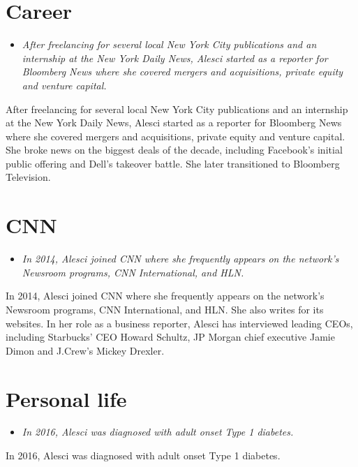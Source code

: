 \section{Career}\label{career}

\begin{itemize}
\item
  \emph{After freelancing for several local New York City publications
  and an internship at the New York Daily News, Alesci started as a
  reporter for Bloomberg News where she covered mergers and
  acquisitions, private equity and venture capital.}
\end{itemize}

After freelancing for several local New York City publications and an
internship at the New York Daily News, Alesci started as a reporter for
Bloomberg News where she covered mergers and acquisitions, private
equity and venture capital. She broke news on the biggest deals of the
decade, including Facebook's initial public offering and Dell's takeover
battle. She later transitioned to Bloomberg Television.

\section{CNN}\label{cnn}

\begin{itemize}
\item
  \emph{In 2014, Alesci joined CNN where she frequently appears on the
  network's Newsroom programs, CNN International, and HLN.}
\end{itemize}

In 2014, Alesci joined CNN where she frequently appears on the network's
Newsroom programs, CNN International, and HLN. She also writes for its
websites. In her role as a business reporter, Alesci has interviewed
leading CEOs, including Starbucks' CEO Howard Schultz, JP Morgan chief
executive Jamie Dimon and J.Crew's Mickey Drexler.

\section{Personal life}\label{personal-life}

\begin{itemize}
\item
  \emph{In 2016, Alesci was diagnosed with adult onset Type 1 diabetes.}
\end{itemize}

In 2016, Alesci was diagnosed with adult onset Type 1 diabetes.

